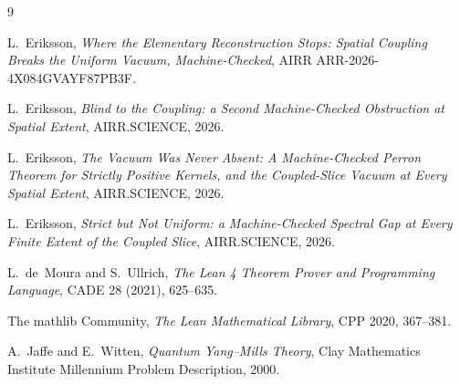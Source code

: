 \documentclass[11pt]{article}
\theoremstyle{definition}
\begin{document}
\begin{thebibliography}{9}

L.~Eriksson,
\emph{Where the Elementary Reconstruction Stops: Spatial Coupling Breaks the
Uniform Vacuum, Machine-Checked}, AIRR ARR-2026-4X084GVAYF87PB3F.

L.~Eriksson,
\emph{Blind to the Coupling: a Second Machine-Checked Obstruction at Spatial
Extent}, AIRR.SCIENCE, 2026.

L.~Eriksson,
\emph{The Vacuum Was Never Absent: A Machine-Checked Perron Theorem for
Strictly Positive Kernels, and the Coupled-Slice Vacuum at Every Spatial
Extent}, AIRR.SCIENCE, 2026.

L.~Eriksson,
\emph{Strict but Not Uniform: a Machine-Checked Spectral Gap at Every Finite
Extent of the Coupled Slice}, AIRR.SCIENCE, 2026.

L.~de~Moura and S.~Ullrich,
\emph{The Lean 4 Theorem Prover and Programming Language},
CADE 28 (2021), 625--635.

The mathlib Community,
\emph{The Lean Mathematical Library},
CPP 2020, 367--381.

A.~Jaffe and E.~Witten,
\emph{Quantum Yang--Mills Theory},
Clay Mathematics Institute Millennium Problem Description, 2000.

\end{thebibliography}
\end{document}
